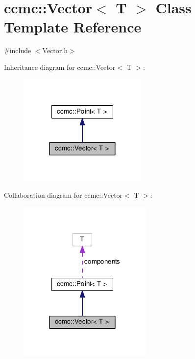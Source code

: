 \hypertarget{classccmc_1_1_vector}{\section{ccmc\-:\-:Vector$<$ T $>$ Class Template Reference}
\label{classccmc_1_1_vector}
}


{\ttfamily \#include $<$Vector.\-h$>$}



Inheritance diagram for ccmc\-:\-:Vector$<$ T $>$\-:
\nopagebreak
\begin{figure}[H]
\begin{center}
\leavevmode
\includegraphics[width=180pt]{classccmc_1_1_vector__inherit__graph}
\end{center}
\end{figure}


Collaboration diagram for ccmc\-:\-:Vector$<$ T $>$\-:
\nopagebreak
\begin{figure}[H]
\begin{center}
\leavevmode
\includegraphics[width=188pt]{classccmc_1_1_vector__coll__graph}
\end{center}
\end{figure}
